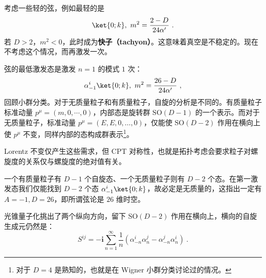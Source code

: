 考虑一些轻的弦，例如最轻的是 
\begin{equation}
	\ket{0; k}, ~ m^2 = \frac{2-D}{24 \alpha'} ~.
\end{equation}
若 $D>2$，$m^2 < 0$，此时成为\textbf{快子（tachyon）}。这意味着真空是不稳定的。现在不考虑这个情况，而再激发一次。

弦的最低激发态是激发 $n=1$ 的模式 $1$ 次：
\begin{equation}
	\alpha_{-1}^i \ket{0; k}, ~ m^2 = \frac{26-D}{24 \alpha'} ~,
\end{equation}
回顾小群分类。对于无质量粒子和有质量粒子，自旋的分析是不同的。有质量粒子标准动量 $p^\mu = (m, 0, \cdots ,0)$，内部态是旋转群 $\text{SO}(D-1)$ 的一个表示。而对于无质量粒子，标准动量 $p^\mu = (E, E, 0, \dots, 0)$，仅能使 $\text{SO}(D-2)$ 作用在横向上使 $p^\mu$ 不变，同样内部的态构成群表示\footnote{对于 $D=4$ 是熟知的，也就是在 Wigner 小群分类讨论过的情况。}。

Lorentz 不变仅产生这些需求，但 CPT 对称性，也就是拓扑考虑会要求粒子对螺旋度的关系仅与螺旋度的绝对值有关。

一个有质量粒子有 $D-1$ 个自旋态、一个无质量粒子则有 $D-2$ 个态。在第一激发态我们仅能找到 $D-2$ 个态 $\alpha_{-1}^i \ket{0; k}$，故必定是无质量的，这指出一定有 $A=-1, D=26$，即所谓弦论是 $26$ 维时空。

光锥量子化挑出了两个纵向方向，留下 $\text{SO}(D-2)$ 作用在横向上，横向的自旋生成元仍然是：
\begin{equation}
	S^{ij} = -\mathbf{i} \sum_{n=1}^\infty \frac{1}{n} (\alpha_{-n}^i \alpha_n^j - \alpha_{-n}^j \alpha_n^i) ~.
\end{equation}